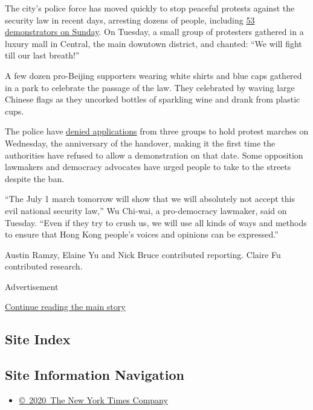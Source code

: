The city's police force has moved quickly to stop peaceful protests
against the security law in recent days, arresting dozens of people,
including
\href{https://news.rthk.hk/rthk/en/component/k2/1534552-20200628.htm}{53
demonstrators on Sunday}. On Tuesday, a small group of protesters
gathered in a luxury mall in Central, the main downtown district, and
chanted: ``We will fight till our last breath!''

A few dozen pro-Beijing supporters wearing white shirts and blue caps
gathered in a park to celebrate the passage of the law. They celebrated
by waving large Chinese flags as they uncorked bottles of sparkling wine
and drank from plastic cups.

The police have
\href{https://news.rthk.hk/rthk/en/component/k2/1534408-20200627.htm}{denied
applications} from three groups to hold protest marches on Wednesday,
the anniversary of the handover, making it the first time the
authorities have refused to allow a demonstration on that date. Some
opposition lawmakers and democracy advocates have urged people to take
to the streets despite the ban.

``The July 1 march tomorrow will show that we will absolutely not accept
this evil national security law,'' Wu Chi-wai, a pro-democracy lawmaker,
said on Tuesday. ``Even if they try to crush us, we will use all kinds
of ways and methods to ensure that Hong Kong people's voices and
opinions can be expressed.''

Austin Ramzy, Elaine Yu and Nick Bruce contributed reporting. Claire Fu
contributed research.

Advertisement

\protect\hyperlink{after-bottom}{Continue reading the main story}

\hypertarget{site-index}{%
\subsection{Site Index}\label{site-index}}

\hypertarget{site-information-navigation}{%
\subsection{Site Information
Navigation}\label{site-information-navigation}}

\begin{itemize}
\tightlist
\item
  \href{https://help.nytimes3xbfgragh.onion/hc/en-us/articles/115014792127-Copyright-notice}{©~2020~The
  New York Times Company}
\end{itemize}

